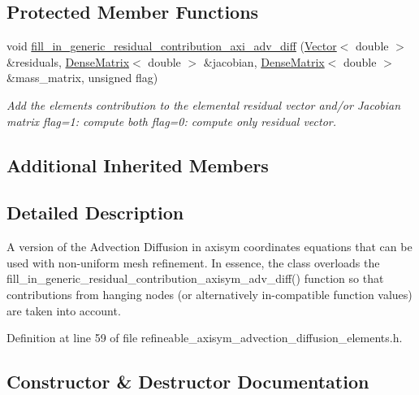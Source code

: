\subsection*{Protected Member Functions}
\begin{DoxyCompactItemize}
\item 
void \hyperlink{classoomph_1_1RefineableAxisymAdvectionDiffusionEquations_aa55874822c3be3ca10bbf4ab908fc844}{fill\+\_\+in\+\_\+generic\+\_\+residual\+\_\+contribution\+\_\+axi\+\_\+adv\+\_\+diff} (\hyperlink{classoomph_1_1Vector}{Vector}$<$ double $>$ \&residuals, \hyperlink{classoomph_1_1DenseMatrix}{Dense\+Matrix}$<$ double $>$ \&jacobian, \hyperlink{classoomph_1_1DenseMatrix}{Dense\+Matrix}$<$ double $>$ \&mass\+\_\+matrix, unsigned flag)
\begin{DoxyCompactList}\small\item\em Add the element\textquotesingle{}s contribution to the elemental residual vector and/or Jacobian matrix flag=1\+: compute both flag=0\+: compute only residual vector. \end{DoxyCompactList}\end{DoxyCompactItemize}
\subsection*{Additional Inherited Members}


\subsection{Detailed Description}
A version of the Advection Diffusion in axisym coordinates equations that can be used with non-\/uniform mesh refinement. In essence, the class overloads the fill\+\_\+in\+\_\+generic\+\_\+residual\+\_\+contribution\+\_\+axisym\+\_\+adv\+\_\+diff() function so that contributions from hanging nodes (or alternatively in-\/compatible function values) are taken into account. 

Definition at line 59 of file refineable\+\_\+axisym\+\_\+advection\+\_\+diffusion\+\_\+elements.\+h.



\subsection{Constructor \& Destructor Documentation}
\mbox{\label{classoomph_1_1RefineableAxisymAdvectionDiffusionEquations_af8b8b167798dd377d8c63e166f7b56cc}} 
